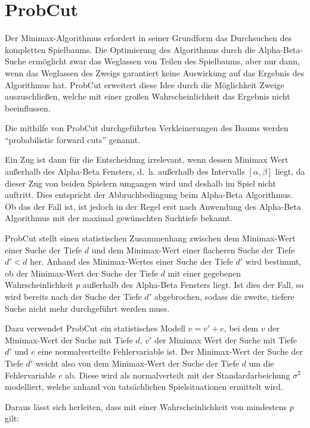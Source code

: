\section{ProbCut}

Der Minimax-Algorithmus erfordert in seiner Grundform das Durchsuchen des kompletten Spielbaums. Die Optimierung des
Algorithmus durch die Alpha-Beta-Suche ermöglicht zwar das Weglassen von Teilen des Spielbaums, aber nur dann, wenn das
Weglassen des Zweigs garantiert keine Auswirkung auf das Ergebnis des Algorithmus hat. ProbCut erweitert diese Idee
durch die Möglichkeit Zweige auszuschließen, welche mit einer großen Wahrscheinlichkeit das Ergebnis nicht beeinflussen.

Die mithilfe von ProbCut durchgeführten Verkleinerungen des Baums werden "`probabilistic forward cuts"' genannt.

Ein Zug ist dann für die Entscheidung irrelevant, wenn dessen Minimax Wert außerhalb des Alpha-Beta Fensters, d. h.
außerhalb des Intervalls \([\alpha,\beta]\) liegt, da dieser Zug von beiden Spielern umgangen wird und deshalb im Spiel
nicht auftritt. Dies entspricht der Abbruchbedingung beim Alpha-Beta Algorithmus. Ob das der Fall ist, ist jedoch in der
Regel erst nach Anwendung des Alpha-Beta Algorithmus mit der maximal gewünschten Suchtiefe bekannt.

ProbCut stellt einen statistischen Zusammenhang zwischen dem Minimax-Wert einer Suche der Tiefe \(d\) und dem
Minimax-Wert einer flacheren Suche der Tiefe \(d'<d\) her. Anhand des Minimax-Wertes einer Suche der Tiefe \(d'\) wird
bestimmt, ob der Minimax-Wert der Suche der Tiefe \(d\) mit einer gegebenen Wahrscheinlichkeit \(p\) außerhalb des
Alpha-Beta Fensters liegt. Ist dies der Fall, so wird bereits nach der Suche der Tiefe \(d'\) abgebrochen, sodass die
zweite, tiefere Suche nicht mehr durchgeführt werden muss.

Dazu verwendet ProbCut ein statistisches Modell \(v=v'+e\), bei dem \(v\) der Minimax-Wert der Suche mit Tiefe \(d\),
\(v'\) der Minimax Wert der Suche mit Tiefe \(d'\) und \(e\) eine normalverteilte Fehlervariable ist. Der Minimax-Wert
der Suche der Tiefe \(d'\) weicht also von dem Minimax-Wert der Suche der Tiefe \(d\) um die Fehlervariable \(e\) ab.
Diese wird als normalverteilt mit der Standardarbeichung \(\sigma^2\) modelliert, welche anhand von tatsächlichen
Spielsituationen ermittelt wird.

Daraus lässt sich herleiten, dass mit einer Wahrscheinlichkeit von mindestens \(p\) gilt:

